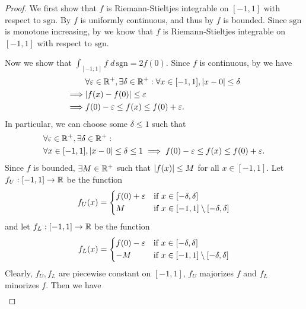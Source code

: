 \begin{proof}
  We first show that \(f\) is Riemann-Stieltjes integrable on \([-1, 1]\) with respect to \(\text{sgn}\).
  By  \(f\) is uniformly continuous, and thus by  \(f\) is bounded.
  Since \(\text{sgn}\) is monotone increasing, by  we know that \(f\) is Riemann-Stieltjes integrable on \([-1, 1]\) with respect to \(\text{sgn}\).

  Now we show that \(\int_{[-1, 1]} f \; d \, \text{sgn} = 2f(0)\).
  Since \(f\) is continuous, by  we have
  \begin{align*}
             & \forall \varepsilon \in \R^+, \exists \delta \in \R^+ : \forall x \in [-1, 1], \abs{x - 0} \leq \delta \\
    \implies & \abs{f(x) - f(0)} \leq \varepsilon                                                                     \\
    \implies & f(0) - \varepsilon \leq f(x) \leq f(0) + \varepsilon.
  \end{align*}
  In particular, we can choose some \(\delta \leq 1\) such that
  \begin{align*}
     & \forall \varepsilon \in \mathbb{R}^+, \exists \delta \in \mathbb{R}^+ :                                                              \\
     & \forall x \in [-1, 1], \left\lvert x - 0\right\rvert \leq \delta \leq 1 \implies f(0) - \varepsilon \leq f(x) \leq f(0) + \varepsilon.
  \end{align*}
  Since \(f\) is bounded, \(\exists M \in \mathbb{R}^+\) such that \(\left\lvert f(x)\right\rvert \leq M\) for all \(x \in [-1, 1]\).
  Let \(f_U : [-1, 1] \to \mathbb{R}\) be the function
  \[
    f_U(x) = \begin{dcases}
      f(0) + \varepsilon & \text{if } x \in [-\delta, \delta]                   \\
      M                  & \text{if } x \in [-1, 1] \setminus [-\delta, \delta]
    \end{dcases}
  \]
  and let \(f_L : [-1, 1] \to \mathbb{R}\) be the function
  \[
    f_L(x) = \begin{dcases}
      f(0) - \varepsilon & \text{if } x \in [-\delta, \delta]                   \\
      -M                 & \text{if } x \in [-1, 1] \setminus [-\delta, \delta]
    \end{dcases}
  \]
  Clearly, \(f_U, f_L\) are piecewise constant on \([-1, 1]\), \(f_U\) majorizes \(f\) and \(f_L\) minorizes \(f\).
  Then we have
  \begin{align*}

\end{align*}
\end{proof}
